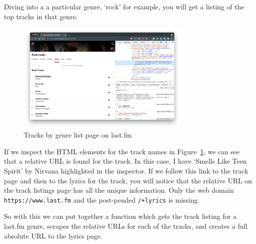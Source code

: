 \documentclass[
  letterpaper,
]{latex/krantz}
\begin{document}
Diving into a a particular genre, `rock' for example, you will get a
listing of the top tracks in that genre.

\begin{figure}[h]

{\centering \includegraphics[width=0.75\textwidth,height=\textheight]{figures/acquire-data/ad-lastfm-genre-tracks-list.png}

}

\caption{\label{fig-ad-genre-tracks-list-lastfm}Tracks by genre list
page on last.fm}

\end{figure}

If we inspect the HTML elements for the track names in
Figure~\ref{fig-ad-genre-tracks-list-lastfm}, we can see that a relative
URL is found for the track. In this case, I have `Smells Like Teen
Spirit' by Nirvana highlighted in the inspector. If we follow this link
to the track page and then to the lyrics for the track, you will notice
that the relative URL on the track listings page has all the unique
information. Only the web domain \texttt{https://www.last.fm} and the
post-pended \texttt{/+lyrics} is missing.

So with this we can put together a function which gets the track listing
for a last.fm genre, scrapes the relative URLs for each of the tracks,
and creates a full absolute URL to the lyrics page.
\end{document}
